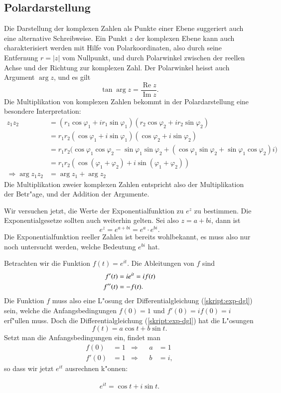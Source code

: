 \subsection{Polardarstellung}
Die Darstellung der komplexen Zahlen als Punkte einer Ebene suggeriert
auch eine alternative Schreibweise.
Ein Punkt $z$ der komplexen Ebene kann auch charakterisiert werden mit Hilfe von
Polarkoordinaten, also durch seine Entfernung $r=|z|$ vom Nullpunkt,
und durch Polarwinkel zwischen der reellen Achse und der Richtung
zur komplexen Zahl. Der Polarwinkel heisst auch Argument $\operatorname{arg}z$,
und es gilt
\[
\tan\operatorname{arg}z=\frac{\operatorname{Re}z}{\operatorname{Im}z}.
\]
Die Multiplikation von komplexen Zahlen bekommt in der Polardarstellung
eine besondere Interpretation:
\begin{align*}
z_1z_2
&=
(r_1\cos\varphi_1+ir_1\sin\varphi_1) (r_2\cos\varphi_2+ir_2\sin\varphi_2)
\\
&=
r_1r_2(\cos\varphi_1+i\sin\varphi_1) (\cos\varphi_2+i\sin\varphi_2)
\\
&=
r_1r_2\bigl(
\cos\varphi_1\cos\varphi_2-\sin\varphi_1\sin\varphi_2 +
(\cos\varphi_1\sin\varphi_2+\sin\varphi_1\cos\varphi_2)i\bigr)
\\
&=
r_1r_2(\cos(\varphi_1+\varphi_2)+i\sin(\varphi_1+\varphi_2))
\\
\Rightarrow \operatorname{arg}z_1z_2&=\arg z_1 + \arg z_2
\end{align*}
Die Multiplikation zweier komplexen Zahlen entspricht also der
Multiplikation der Betr"age, und der Addition der Argumente.

Wir versuchen jetzt, die Werte der Exponentialfunktion zu $e^z$ zu
bestimmen.
Die Exponentialgesetze sollten auch weiterhin gelten.
Sei also $z=a+bi$, dann ist
\[
e^z=e^{a+bi}=e^a\cdot e^{bi}.
\]
Die Exponentialfunktion reeller Zahlen ist bereits wohlbekannt, es muss
also nur noch untersucht werden, welche Bedeutung $e^{bi}$ hat.

Betrachten wir die Funktion $f(t)= e^{it}$. Die Ableitungen von $f$ sind
\begin{align}
f'(t)&=ie^{it}=if(t)\notag\\
f''(t)&=-f(t).\label{skript:exp-dgl}
\end{align}
Die Funktion $f$ muss also eine L"osung der Differentialgleichung
(\ref{skript:exp-dgl}) sein, welche die Anfangsbedingungen $f(0)=1$ und
$f'(0)=if(0)=i$ erf"ullen muss.
Doch die Differentialgleichung (\ref{skript:exp-dgl}) hat die L"osungen
\[
f(t)=a\cos t+b\sin t.
\]
Setzt man die Anfangsbedingungen ein, findet man
\begin{align*}
f(0)&=1&\Rightarrow&&a&=1\\
f'(0)&=1&\Rightarrow&&b&=i,
\end{align*}
so dass wir jetzt $e^{it}$ ausrechnen k"onnen:
\begin{satz}[Euler]
\begin{align}
e^{it}=\cos t+i\sin t.
\label{skript:euler-formula}
\end{align}
\end{satz}

